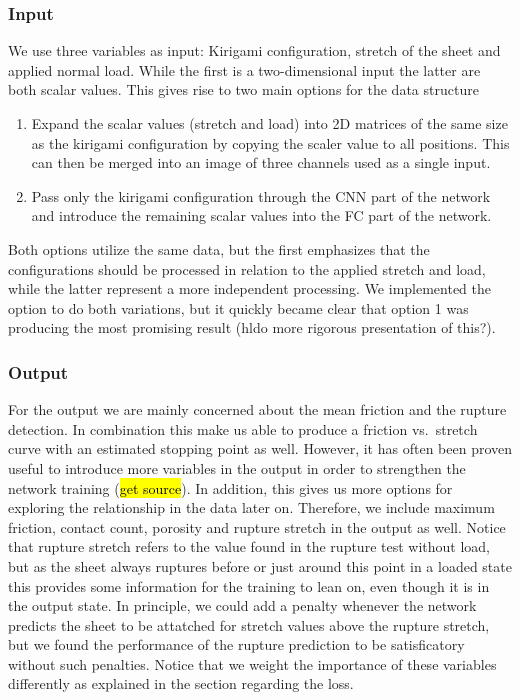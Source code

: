 \subsubsection{Input}
We use three variables as input: Kirigami configuration, stretch of the sheet
and applied normal load. While the first is a two-dimensional input the latter
are both scalar values. This gives rise to two main options for the data structure
\begin{enumerate}
  \item Expand the scalar values (stretch and load) into 2D matrices of the same
  size as the kirigami configuration by copying the scaler value to all positions. This can then be merged into an image of three channels used as a single input.  
  \item Pass only the kirigami configuration through the \acrshort{CNN} part of the network and introduce the remaining scalar values into the \acrshort{FC} part of the network. 
\end{enumerate}
Both options utilize the same data, but the first emphasizes that the configurations should be processed in relation to the applied stretch and load, while the latter represent a more independent processing. We implemented the option to do both variations, but it quickly became clear that option 1 was producing the most promising result ({hl{do more rigorous presentation of this?}}).

\subsubsection{Output}
For the output we are mainly concerned about the mean friction and the rupture
detection. In combination this make us able to produce a friction vs.\ stretch curve with an estimated stopping point as well.  However, it has often been proven useful to introduce more variables in the output in order to strengthen the network training
(\hl{get source}). In addition, this gives us more options for exploring the
relationship in the data later on. Therefore, we include maximum friction, contact
count, porosity and rupture stretch in the output as well. Notice that rupture stretch
refers to the value found in the rupture test without load, but as the sheet
always ruptures before or just around this point in a loaded state this provides
some information for the training to lean on, even though it is in the output
state. In principle, we could add a penalty whenever the network predicts the
sheet to be attatched for stretch values above the rupture stretch, but we found
the performance of the rupture prediction to be satisficatory without such penalties. Notice that we weight the importance of these
variables differently as explained in the section regarding the loss. 

